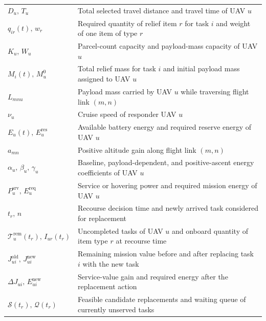 \begin{longtable}{p{3.5cm} p{10cm}}
$D_u,\,T_u$
& Total selected travel distance and travel time of UAV $u$ \\
$q_{ir}(t),\,w_r$
& Required quantity of relief item $r$ for task $i$ and weight of one item of type $r$ \\
$K_u,\,W_u$
& Parcel-count capacity and payload-mass capacity of UAV $u$ \\
$M_i(t),\,M_u^0$
& Total relief mass for task $i$ and initial payload mass assigned to UAV $u$ \\
$L_{mnu}$
& Payload mass carried by UAV $u$ while traversing flight link $(m,n)$ \\
$\nu_u$
& Cruise speed of responder UAV $u$ \\
$E_u(t),\,E_u^{\mathrm{res}}$
& Available battery energy and required reserve energy of UAV $u$ \\
$a_{mn}$
& Positive altitude gain along flight link $(m,n)$ \\
$\alpha_u,\,\beta_u,\,\gamma_u$
& Baseline, payload-dependent, and positive-ascent energy coefficients of UAV $u$ \\
$P_u^{\mathrm{srv}},\,E_u^{\mathrm{req}}$
& Service or hovering power and required mission energy of UAV $u$ \\
$t_r,\,n$
& Recourse decision time and newly arrived task considered for replacement \\
$\mathcal{T}_u^{\mathrm{rem}}(t_r),\,I_{ur}(t_r)$
& Uncompleted tasks of UAV $u$ and onboard quantity of item type $r$ at recourse time \\
$J_{ui}^{\mathrm{old}},\,J_{ui}^{\mathrm{new}}$
& Remaining mission value before and after replacing task $i$ with the new task \\
$\Delta J_{ui},\,E_{ui}^{\mathrm{new}}$
& Service-value gain and required energy after the replacement action \\
$\mathcal{S}(t_r),\,\mathcal{Q}(t_r)$
& Feasible candidate replacements and waiting queue of currently unserved tasks \\
\end{longtable}
\endgroup

\clearpage



